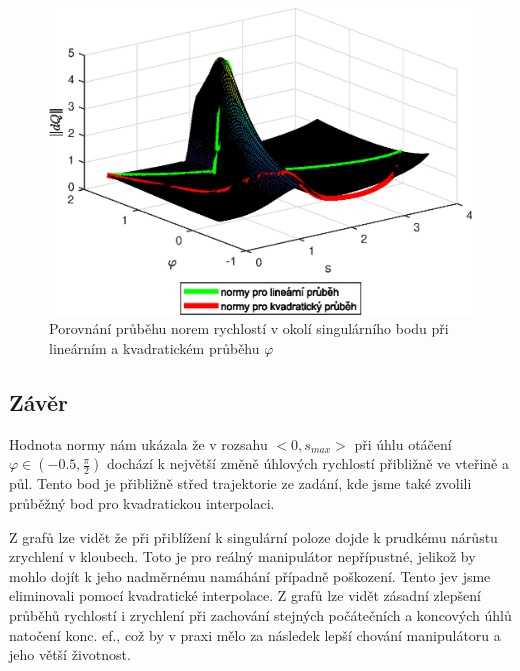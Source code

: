 \documentclass{article}
\begin{document}
			\begin{figure}[H]
				\centering
				\includegraphics[width=\textwidth]{./Graphics/6_Graphics/Norma3d_vekt_dQ_vse.eps}
				\caption{Porovnání průběhu norem rychlostí v okolí singulárního bodu při lineárním a kvadratickém průběhu \(\varphi\)}
				\label{pic:6_vsechny normy}
			\end{figure}
		\subsection{Závěr}
		Hodnota normy nám ukázala že v rozsahu $<0,s_{max}>$ při úhlu otáčení $\varphi \in(-0.5,\frac{\pi}{2})$ dochází k největší změně úhlových rychlostí přibližně ve vteřině a půl. Tento bod je přibližně střed trajektorie ze zadání, kde jsme také zvolili průběžný bod pro kvadratickou interpolaci. 
		\par 
		Z grafů lze vidět že při přiblížení k singulární poloze dojde k prudkému nárůstu zrychlení v kloubech. Toto je pro reálný manipulátor nepřípustné, jelikož by mohlo dojít k jeho nadměrnému namáhání případně poškození.
		Tento jev jsme eliminovali pomocí kvadratické interpolace. Z grafů lze vidět zásadní zlepšení průběhů rychlostí i zrychlení při zachování stejných počátečních a koncových úhlů natočení konc. ef., což by v praxi mělo za následek lepší chování manipulátoru a jeho větší životnost.
		
		
\end{document}
